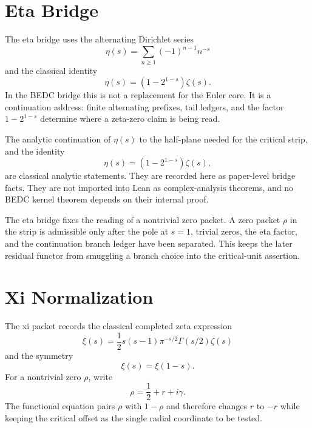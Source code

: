 \section{Eta Bridge}
\label{sec:rh-zeta-critical-unit-eta-bridge}

\begin{definition}
\label{def:rh-zeta-critical-unit-eta-bridge}
The eta bridge uses the alternating Dirichlet series
$$
\eta(s)=\sum_{n\geq 1}(-1)^{n-1}n^{-s}
$$
and the classical identity
$$
\eta(s)=(1-2^{1-s})\zeta(s).
$$
In the BEDC bridge this is not a replacement for the Euler core. It is a
continuation address: finite alternating prefixes, tail ledgers, and the
factor $1-2^{1-s}$ determine where a zeta-zero claim is being read.
\end{definition}

\begin{principle}
\label{prin:rh-zeta-critical-unit-eta-classical}
The analytic continuation of $\eta(s)$ to the half-plane needed for the
critical strip, and the identity
$$
\eta(s)=(1-2^{1-s})\zeta(s),
$$
are classical analytic statements. They are recorded here as paper-level
bridge facts. They are not imported into Lean as complex-analysis
theorems, and no BEDC kernel theorem depends on their internal proof.
\end{principle}

The eta bridge fixes the reading of a nontrivial zero packet. A zero
packet $\rho$ in the strip is admissible only after the pole at $s=1$,
trivial zeros, the eta factor, and the continuation branch ledger have
been separated. This keeps the later residual functor from smuggling a
branch choice into the critical-unit assertion.

\section{Xi Normalization}
\label{sec:rh-zeta-critical-unit-xi}

\begin{definition}
\label{def:rh-zeta-critical-unit-xi}
The xi packet records the classical completed zeta expression
$$
\xi(s)
=
\frac{1}{2}s(s-1)\pi^{-s/2}\Gamma(s/2)\zeta(s)
$$
and the symmetry
$$
\xi(s)=\xi(1-s).
$$
For a nontrivial zero $\rho$, write
$$
\rho=\frac12+r+i\gamma.
$$
The functional equation pairs $\rho$ with $1-\rho$ and therefore changes
$r$ to $-r$ while keeping the critical offset as the single radial
coordinate to be tested.
\end{definition}

